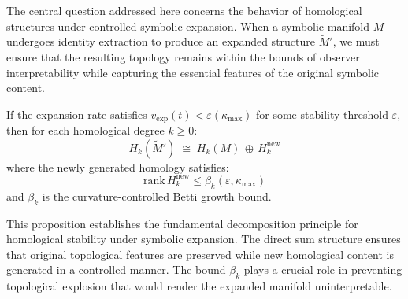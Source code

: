 The central question addressed here concerns the behavior of homological structures under controlled symbolic expansion. When a symbolic manifold $M$ undergoes identity extraction to produce an expanded structure $\widetilde{M}'$, we must ensure that the resulting topology remains within the bounds of observer interpretability while capturing the essential features of the original symbolic content.

\begin{proposition}
\label{proposition:bk4_homological_extension}
If the expansion rate satisfies $v_{\text{exp}}(t)<\varepsilon(\kappa_{\max})$ for some stability threshold $\varepsilon$, then for each homological degree $k\ge0$:
\[
H_k(\widetilde{M}')\;\cong\;
H_k(M)\,\oplus\,H_k^{\mathrm{new}}
\]
where the newly generated homology satisfies:
\[
\text{rank}\,H_k^{\mathrm{new}}\le
\beta_k(\varepsilon,\kappa_{\max})
\]
and $\beta_k$ is the curvature-controlled Betti growth bound.
\end{proposition}

This proposition establishes the fundamental decomposition principle for homological stability under symbolic expansion. The direct sum structure ensures that original topological features are preserved while new homological content is generated in a controlled manner. The bound $\beta_k$ plays a crucial role in preventing topological explosion that would render the expanded manifold uninterpretable.

